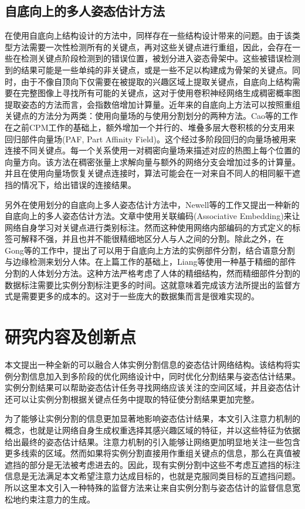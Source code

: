 \subsection{自底向上的多人姿态估计方法}
\label{subsec:bottomup}
在使用自底向上结构设计的方法中，同样存在一些结构设计带来的问题。由于该类型方法需要一次性检测所有的关键点，再对这些关键点进行重组，因此，会存在一些在检测关键点阶段检测到的错误位置，被划分进入姿态骨架中。这些被错误检测到的结果可能是一些单纯的非关键点，或是一些不足以构建成为骨架的关键点。同时，由于不像自顶向下仅需要在被提取的兴趣区域上提取关键点，自底向上结构需要在完整图像上寻找所有可能的关键点，这对于使用卷积神经网络生成稠密概率图提取姿态的方法而言，会指数倍增加计算量。近年来的自底向上方法可以按照重组关键点的方法分为两类：使用向量场的与使用分割划分的两种方法。Cao等的工作\cite{Cao2016Realtime}在之前CPM工作的基础上，额外增加一个并行的、堆叠多层大卷积核的分支用来回归部件向量场(PAF, Part Affinity Field)。这个经过多阶段回归的向量场被用来连接不同关键点。每一个关系使用一对稠密向量场来描述对应的热图上每个位置的向量方向。该方法在稠密张量上求解向量与额外的网络分支会增加过多的计算量。并且在使用向量场恢复关键点连接时，算法可能会在一对来自不同人的相同躯干遮挡的情况下，给出错误的连接结果。

另外在使用划分的自底向上多人姿态估计方法中，Newell等的工作\cite{Newell2017Associative}又提出一种新的自底向上的多人姿态估计方法。文章中使用关联编码(Associative Embedding)来让网络自身学习对关键点进行类别标注。然而这种使用网络内部编码的方式定义的标签可解释不强，并且也并不能很精细地区分人与人之间的分割。除此之外，在Gong等的工作中\cite{gong2018instance}，提出了可以用于自底向上方法的实例部件分割，结合语意分割与边缘检测来划分人体。在上篇工作的基础上，Liang等使用一种基于精细的部件分割的人体划分方法\cite{liang2019look}。这种方法严格考虑了人体的精细结构，然而精细部件分割的数据标注需要比实例分割标注更多的时间。这就意味着完成该方法所提出的监督方式是需要更多的成本的。这对于一些庞大的数据集而言是很难实现的。
\section{研究内容及创新点}
\label{sec:contribution}
本文提出一种全新的可以融合人体实例分割信息的姿态估计网络结构。该结构将实例分割信息加入到多阶段的优化网络设计中，同时优化分割结果与姿态估计结果。实例分割结果可以帮助姿态估计任务寻找网络应该关注的空间区域，并且姿态估计还可以让实例分割根据关键点任务中提取的特征使分割结果更加完整。

为了能够让实例分割的信息更加显著地影响姿态估计结果，本文引入注意力机制的概念，也就是让网络自身生成权重选择其感兴趣区域的特征，并以这些特征为依据给出最终的姿态估计结果。注意力机制的引入能够让网络更加明显地关注一些包含更多线索的区域。然而如果将实例分割直接用作重组关键点的信息，那么在真值被遮挡的部分是无法被考虑进去的。因此，现有实例分割中这些不考虑互遮挡的标注信息是无法满足本文希望注意力达成目标的，也就是克服同类目标的互遮挡问题。所以这里本文引入一种特殊的监督方法来让来自实例分割与姿态估计的监督信息宽松地约束注意力的生成。

